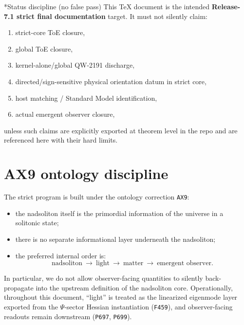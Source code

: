 \documentclass[11pt,a4paper]{article}
\makeatletter
\newcommand{\chapter}{\@ifstar{\section*}{\section}}
\makeatother
\begin{document}
\chapter*{Status discipline (no false pass)}
This TeX document is the intended \textbf{Release-7.1 strict final documentation} target.
It must not silently claim:
\begin{enumerate}[label=\arabic*.]
  \item strict-core ToE closure,
  \item global ToE closure,
  \item kernel-alone/global QW-2191 discharge,
  \item directed/sign-sensitive physical orientation datum in strict core,
  \item host matching / Standard Model identification,
  \item actual emergent observer closure,
\end{enumerate}
unless such claims are explicitly exported at theorem level in the repo and are referenced here with their hard limits.

\tableofcontents

\chapter{Ontology and scope}
\section{AX9 ontology discipline}

The strict program is built under the ontology correction \texttt{AX9}:

\begin{itemize}
  \item the nadsoliton itself is the primordial information of the universe in a solitonic state;
  \item there is no separate informational layer underneath the nadsoliton;
  \item the preferred internal order is:
  \[
    \text{nadsoliton}\ \to\ \text{light}\ \to\ \text{matter}\ \to\ \text{emergent observer}.
  \]
\end{itemize}

In particular, we do not allow observer-facing quantities to silently back-propagate into the upstream definition of the nadsoliton core.
Operationally, throughout this document, “light” is treated as the linearized eigenmode layer exported from the $\Psi$-sector Hessian instantiation (\texttt{F459}),
and observer-facing readouts remain downstream (\texttt{P697}, \texttt{P699}).
\end{document}
